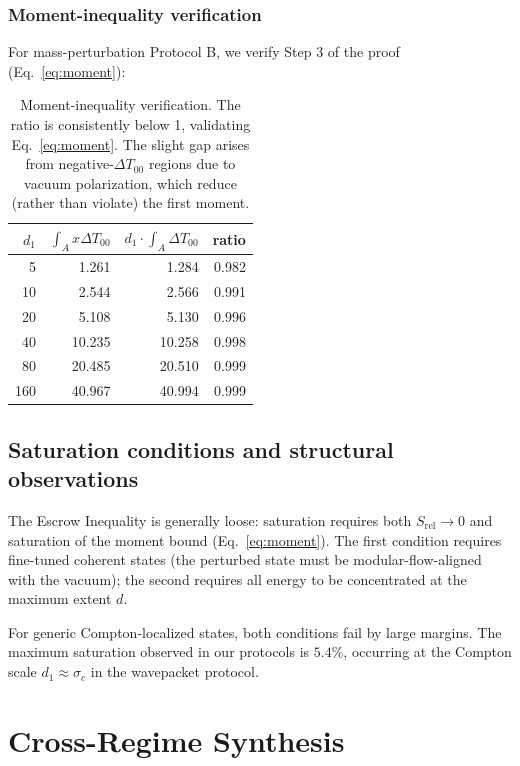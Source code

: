 \documentclass[11pt]{article}
\begin{document}
\subsubsection{Moment-inequality verification}

For mass-perturbation Protocol B, we verify Step 3 of the proof (Eq.~\ref{eq:moment}):

\begin{table}[h]
\centering
\begin{tabular}{rrrr}
\toprule
$d_1$ & $\int_A x \Delta T_{00}$ & $d_1 \cdot \int_A \Delta T_{00}$ & ratio \\
\midrule
5  & 1.261 & 1.284 & 0.982 \\
10 & 2.544 & 2.566 & 0.991 \\
20 & 5.108 & 5.130 & 0.996 \\
40 & 10.235 & 10.258 & 0.998 \\
80 & 20.485 & 20.510 & 0.999 \\
160 & 40.967 & 40.994 & 0.999 \\
\bottomrule
\end{tabular}
\caption{Moment-inequality verification. The ratio is consistently below 1, validating Eq.~\ref{eq:moment}. The slight gap arises from negative-$\Delta T_{00}$ regions due to vacuum polarization, which reduce (rather than violate) the first moment.}
\label{tab:moment}
\end{table}

\subsection{Saturation conditions and structural observations}

The Escrow Inequality is generally loose: saturation requires both $S_{\mathrm{rel}} \to 0$ and saturation of the moment bound (Eq.~\ref{eq:moment}). The first condition requires fine-tuned coherent states (the perturbed state must be modular-flow-aligned with the vacuum); the second requires all energy to be concentrated at the maximum extent $d$.

For generic Compton-localized states, both conditions fail by large margins. The maximum saturation observed in our protocols is $5.4\%$, occurring at the Compton scale $d_1 \approx \sigma_c$ in the wavepacket protocol.

\section{Cross-Regime Synthesis}
\end{document}
